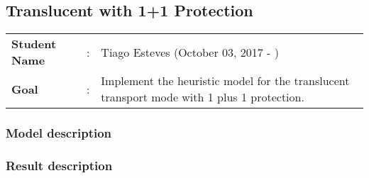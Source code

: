 \clearpage

\subsection{Translucent with 1+1 Protection}\label{heuristic_Transluc_Protection}
\begin{tcolorbox}	
\begin{tabular}{p{2.75cm} p{0.2cm} p{10.5cm}} 	
\textbf{Student Name}  &:& Tiago Esteves    (October 03, 2017 - )\\
\textbf{Goal}          &:& Implement the heuristic model for the translucent transport mode with 1 plus 1 protection.
\end{tabular}
\end{tcolorbox}

\subsubsection{Model description}

\subsubsection{Result description}